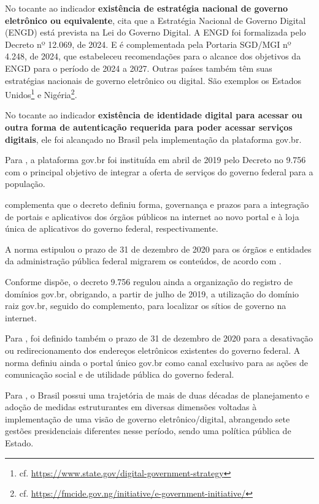 No tocante ao indicador \textbf{existência de estratégia nacional de governo
eletrônico ou equivalente}, \cite{brasil_engd} cita que a Estratégia Nacional de Governo Digital (ENGD) está prevista na Lei do Governo Digital. A ENGD foi formalizada pelo Decreto nº 12.069, de 2024. E é complementada pela Portaria SGD/MGI nº 4.248, de 2024, que estabeleceu recomendações para o alcance dos objetivos da ENGD para o período de 2024 a 2027. Outras países também têm suas estratégias nacionais de governo eletrônico ou digital. São exemplos os Estados Unidos\footnote{cf. \url{https://www.state.gov/digital-government-strategy}} e Nigéria\footnote{cf. \url{https://fmcide.gov.ng/initiative/e-government-initiative/}}.

No tocante ao indicador \textbf{existência de identidade digital para acessar
ou outra forma de autenticação requerida para poder acessar serviços digitais}, ele foi alcançado no Brasil pela implementação da plataforma gov.br. 

Para \cite{mitkiewicz2024transformaccao}, a plataforma gov.br foi instituída em abril de 2019 pelo Decreto no 9.756 com o principal objetivo de integrar a oferta de serviços do governo federal para a população. 

\cite{mitkiewicz2024transformaccao} complementa que o decreto definiu forma, governança e prazos para a integração de portais e aplicativos dos órgãos públicos na internet ao novo portal e à loja única de aplicativos do governo federal, respectivamente. 

A norma estipulou o prazo de 31 de dezembro de 2020 para os órgãos e entidades da administração pública federal migrarem os conteúdos, de acordo com \cite{mitkiewicz2024transformaccao}.

Conforme \cite{mitkiewicz2024transformaccao} dispõe, o decreto 9.756 regulou ainda a organização do registro de domínios gov.br, obrigando, a partir de julho de 2019, a utilização do domínio raiz gov.br, seguido do complemento, para localizar os sítios de governo na internet. 

Para \cite{mitkiewicz2024transformaccao}, foi definido também o prazo de 31 de dezembro de 2020 para a desativação ou redirecionamento dos endereços eletrônicos existentes do governo federal. A norma definiu ainda o portal único gov.br como canal exclusivo para as ações de comunicação social e de utilidade pública do governo federal.

Para \cite{mitkiewicz2024transformaccao}, o Brasil possui uma trajetória de mais de duas décadas de planejamento e adoção de medidas estruturantes em diversas dimensões voltadas à implementação de uma visão de governo eletrônico/digital, abrangendo sete gestões presidenciais diferentes nesse período, sendo uma política pública de Estado.

